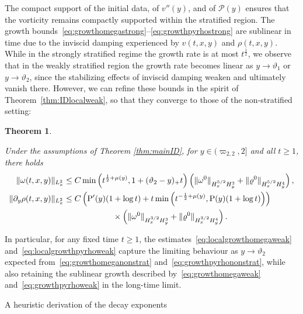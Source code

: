 \documentclass[11pt,reqno]{amsproc}
\makeatletter
\renewcommand\subsection{\@startsection{subsection}{2}%
\normalparindent{.5\linespacing\@plus.7\linespacing}{-.5em}
{\normalfont\bfseries}}
\newcounter{bigthm}
\newtheorem{bigtheorem}[bigthm]{Theorem}
\theoremstyle{definition}
\numberwithin{equation}{section}
\renewcommand{\P}{{\mathcal{P}}}
\makeatother
\begin{document}
The compact support of the initial data, of \( v''(y) \), and of \( \P(y) \) ensures that the vorticity remains compactly supported within the stratified region. The growth bounds~\eqref{eq:growthomegastrong}--\eqref{eq:growthpyrhostrong} are sublinear in time due to the inviscid damping experienced by \( v(t,x,y) \) and \( \rho(t,x,y) \). While in the strongly stratified regime the growth rate is at most \( t^{\frac{1}{2}} \), we observe that in the weakly stratified region the growth rate becomes linear as \( y \to \vartheta_{1} \) or \( y \to \vartheta_{2} \), since the stabilizing effects of inviscid damping weaken and ultimately vanish there. However, we can refine these bounds in the spirit of Theorem~\ref{thm:IDlocalweak}, so that they converge to those of the non-stratified setting:

\begin{bigtheorem}\label{thm:growthlocalweak}

Under the assumptions of Theorem \ref{thm:mainID}, for $y\in  (\varpi_{2,2}, 2]$ and all $t\geq1$, there holds
\begin{align}\label{eq:localgrowthomegaweak}
\Vert \omega(t,x,y) \Vert_{L^2_x}  & \leq C \min \left( t^{\frac12+\mu(y)}, 1 + (\vartheta_2 - y)_+t \right) \left(  \Vert \omega^0 \Vert_{H^{5/2}_x H^3_y} + \Vert \varrho^0 \Vert_{H^{5/2}_x H^4_y}\right),  \\
\label{eq:localgrowthpyrhoweak} 
\Vert \partial_y\rho(t,x,y) \Vert_{L^2_x} &\leq C \left( \mathrm{P}'(y)(1+\log t) +  t\min \left( t^{-\frac12+\mu(y)}, \mathrm{P}(y)(1+\log t) \right) \right)  \\
&\qquad\qquad\qquad \times \left(  \Vert \omega^0 \Vert_{H^{3/2}_x H^3_y} + \Vert \varrho^0 \Vert_{H^{3/2}_x H^4_y}\right). \notag
\end{align}
\end{bigtheorem}

In particular, for any fixed time \( t \geq 1 \), the estimates~\eqref{eq:localgrowthomegaweak} and~\eqref{eq:localgrowthpyrhoweak} capture the limiting behaviour as \( y \to \vartheta_{2} \) expected from~\eqref{eq:growthomeganonstrat} and~\eqref{eq:growthpyrhononstrat}, while also retaining the sublinear growth described by~\eqref{eq:growthomegaweak} and~\eqref{eq:growthpyrhoweak} in the long-time limit.


\subsection{A heuristic derivation of the decay exponents}\label{subsec:heuristics}
\end{document}
